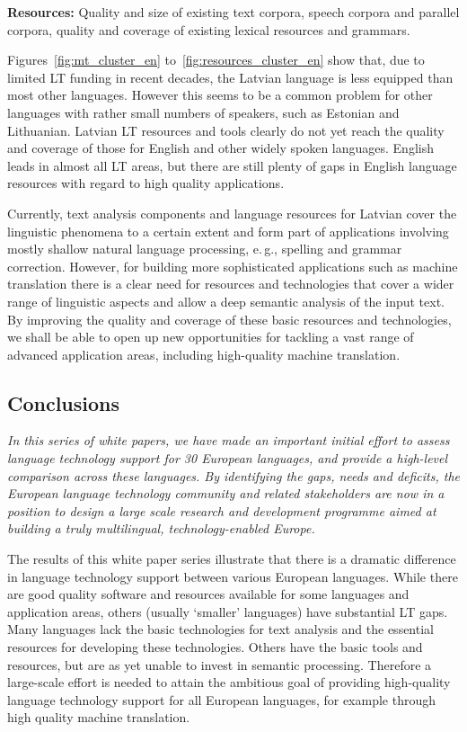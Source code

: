 \begin{multicols}{2}
\textbf{Resources:} Quality and size of existing text corpora, speech corpora and parallel corpora, quality and coverage of existing lexical resources and grammars.

Figures~\ref{fig:mt_cluster_en} to~\ref{fig:resources_cluster_en} show that, due to limited LT funding in recent decades, the Latvian language is less equipped than most other languages.  However this seems to be a common problem for other languages with rather small numbers of speakers, such as Estonian and Lithuanian.  Latvian LT resources and tools clearly do not yet reach the quality and coverage of those for English and other widely spoken languages.  English leads in almost all LT areas, but there are still plenty of gaps in English language resources with regard to high quality applications.

Currently, text analysis components and language resources for Latvian cover the linguistic phenomena to a certain extent and form part of applications involving mostly shallow natural language processing, e.\,g., spelling and grammar correction.
%
However, for building more sophisticated applications such as machine translation there is a clear need for resources and technologies that cover a wider range of linguistic aspects and allow a deep semantic analysis of the input text.  By improving the quality and coverage of these basic resources and technologies, we shall be able to open up new opportunities for tackling a vast range of advanced application areas, including high-quality machine translation.

\subsection{Conclusions}

\emph{In this series of white papers, we have made an important initial effort to assess language technology support for 30 European languages, and provide a high-level comparison across these languages.
By identifying the gaps, needs and deficits, the European language technology community and related stakeholders are now in a position to design a large scale research and development programme aimed at building a truly multilingual, technology-enabled Europe.}

The results of this white paper series illustrate that there is a dramatic difference in language technology support between various European languages.
While there are good quality software and resources available for some languages and application areas, others (usually `smaller' languages) have substantial LT gaps.
Many languages lack the basic technologies for text analysis and the essential resources for developing these technologies.
Others have the basic tools and resources, but are as yet unable to invest in semantic processing.
Therefore a large-scale effort is needed to attain the ambitious goal of providing high-quality language technology support for all European languages, for example through high quality machine translation.


\end{multicols}

